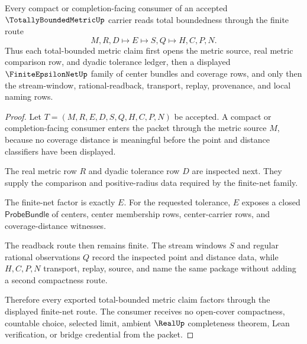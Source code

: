 \begin{theorem}
\label{thm:totally-bounded-metric-finite-net-factorization}
Every compact or completion-facing consumer of an accepted $\TotallyBoundedMetricUp$ carrier reads total boundedness through the finite route
$$
M,R,D \longmapsto E \longmapsto S,Q \longmapsto H,C,P,N .
$$
Thus each total-bounded metric claim first opens the metric source, real metric comparison row, and dyadic tolerance ledger, then a displayed $\FiniteEpsilonNetUp$ family of center bundles and coverage rows, and only then the stream-window, rational-readback, transport, replay, provenance, and local naming rows.
\end{theorem}
\begin{proof}
Let $T=(M,R,E,D,S,Q,H,C,P,N)$ be accepted. A compact or completion-facing consumer enters the packet through the metric source $M$, because no coverage distance is meaningful before the point and distance classifiers have been displayed.

The real metric row $R$ and dyadic tolerance row $D$ are inspected next. They supply the comparison and positive-radius data required by the finite-net family.

The finite-net factor is exactly $E$. For the requested tolerance, $E$ exposes a closed $\mathsf{ProbeBundle}$ of centers, center membership rows, center-carrier rows, and coverage-distance witnesses.

The readback route then remains finite. The stream windows $S$ and regular rational observations $Q$ record the inspected point and distance data, while $H,C,P,N$ transport, replay, source, and name the same package without adding a second compactness route.

Therefore every exported total-bounded metric claim factors through the displayed finite-net route. The consumer receives no open-cover compactness, countable choice, selected limit, ambient $\RealUp$ completeness theorem, Lean verification, or bridge credential from the packet.
\end{proof}

